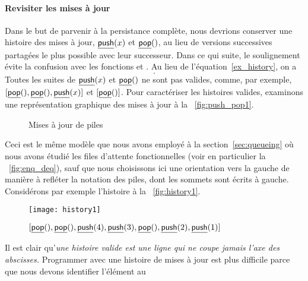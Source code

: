 \paragraph{Revisiter les mises à jour}

Dans le but de parvenir à la persistance complète, nous devrions
conserver une histoire des mises à jour, \(\underline{\textsf{push}}(x)\) et
\(\underline{\textsf{pop}}()\), au lieu de versions
successives partagées le plus possible avec leur successeur. Dans ce
qui suite, le soulignement évite la confusion avec les fonctions
 et
. Au lieu de
l'équation~\eqref{ex_history}, on a
\begin{equation}
[\ufun{push}(4), \ufun{pop}(), \ufun{push}(3), \ufun{push}(2),
\ufun{push}(1)].
\label{ex_history1}
\end{equation}
Toutes les suites de \(\underline{\textsf{push}}(x)\) et \(\underline{\textsf{pop}}()\) ne sont
pas valides, comme, par exemple, \([\underline{\textsf{pop}}(), \underline{\textsf{pop}}(),
  \underline{\textsf{push}}(x)]\) et \([\underline{\textsf{pop}}()]\). Pour caractériser les
histoires valides, examinons une représentation graphique des mises à
jour à la \fig~\vref{fig:push_pop1}.
\begin{figure}[!b]
\centering
{}
\qquad
{}
\caption{Mises à jour de piles}
\label{fig:push_pop1}
\end{figure}
Ceci est le même modèle que nous avons employé à la
section~\ref{sec:queueing} où nous avons étudié les files d'attente
fonctionnelles (voir en particulier la \fig~\vref{fig:enq_deq}), sauf
que nous choisissons ici une orientation vers la gauche de manière à
refléter la notation des piles, dont les sommets sont écrits à
gauche. Considérons par exemple l'histoire à la
\fig~\vref{fig:history1}.
\begin{figure}[t]
\centering
\texttt{[image: history1]}
\caption{$[\underline{\textsf{pop}}(), \underline{\textsf{pop}}(), \underline{\textsf{push}}(4),\underline{\textsf{push}}(3),
      \underline{\textsf{pop}}(), \underline{\textsf{push}}(2), \underline{\textsf{push}}(1)]$}
\label{fig:history1}
\end{figure}
Il est clair qu'\emph{une histoire valide est une ligne qui ne coupe
  jamais l'axe des abscisses.} Programmer
 avec une histoire de mises à jour
est plus difficile parce que nous devons identifier l'élément au
